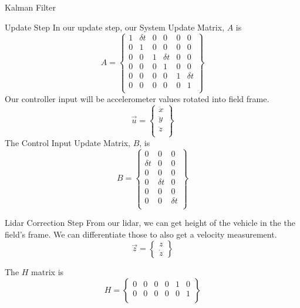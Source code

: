 \documentclass[12pt]{article}
\begin{document}
\begin{section}{Kalman Filter}
\begin{subsection}{Update Step}
In our update step, our System Update Matrix, $A$ is 
\begin{equation}
A = \begin{Bmatrix}
1 & \delta{t} & 0 & 0 & 0 & 0 \\
0 & 1 & 0 & 0 & 0 & 0\\
0 & 0 & 1 & \delta{t} & 0 & 0 \\
0 & 0 & 0 & 1 & 0 & 0\\
0 & 0 & 0 & 0 & 1 & \delta{t}\\
0 & 0 & 0 & 0 & 0 & 1\\
\end{Bmatrix}
\end{equation}
Our controller input will be accelerometer values rotated into field frame.
\begin{equation}
\vec{u} = \begin{Bmatrix}
\ddot{x}\\
\ddot{y}\\
\ddot{z}\\
\end{Bmatrix}
\end{equation}
The Control Input Update Matrix, $B$, is
\begin{equation}
B = \begin{Bmatrix}
0 & 0 & 0\\
\delta{t} & 0 & 0\\
0 & 0 & 0\\
0 & \delta{t} & 0\\
0 & 0 & 0\\
0 & 0 & \delta{t}\\
\end{Bmatrix}
\end{equation}
\end{subsection}

\begin{subsection}{Lidar Correction Step}
From our lidar, we can get height of the vehicle in the the field's frame. We can differentiate those to also get a velocity measurement.
\begin{equation}
\vec{z} = \begin{Bmatrix}
z\\
\dot{z}
\end{Bmatrix}
\end{equation}

The $H$ matrix is
\begin{equation}
H = \begin{Bmatrix}
0 & 0 & 0 & 0 & 1 & 0\\
0 & 0 & 0 & 0 & 0 & 1\\
\end{Bmatrix}
\end{equation}


\end{subsection}
\end{section}
\end{document}
